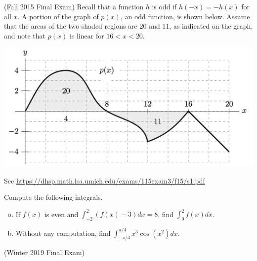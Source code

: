 \documentclass[11pt]{exam}
\begin{document}
\begin{questions}
\begin{solution}
\begin{enumerate}
  \end{enumerate}
\end{solution}
\question (Fall 2015 Final Exam)
Recall that a function \(h\) is odd if \(h(-x) = -h(x)\) for all \(x\). A portion of the graph
of \(p(x)\), an odd function, is shown below. Assume that the areas of the two shaded regions are
20 and 11, as indicated on the graph, and note that \(p(x)\) is linear for \(16 < x < 20\).
\begin{center}
  \includegraphics[scale=0.5]{Figures/graph_f15}
\end{center}
\begin{solution}
  See \href{https://dhsp.math.lsa.umich.edu/exams/115exam3/f15/s1.pdf}{https://dhsp.math.lsa.umich.edu/exams/115exam3/f15/s1.pdf}
\end{solution}
\pagebreak
\question Compute the following integrals.
  \begin{enumerate}[(a)]
\item If $f(x)$ is even and $\int_{-2}^{2} ( f(x) - 3) dx = 8$, find $\int_{0}^2 f(x) dx$. 
\item Without any computation, find $\int_{-\pi/4}^{\pi/4} x^3 \cos( x^2 ) dx$. 
  \end{enumerate}
\question (Winter 2019 Final Exam) 


\end{questions}
\end{document}

